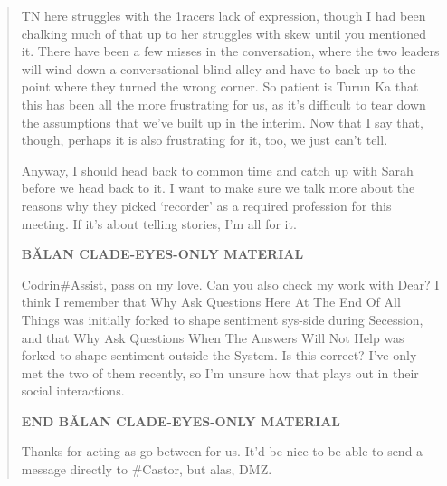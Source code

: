 \begin{quote}
TN here struggles with the 1racers lack of expression, though I had been chalking much of that up to her struggles with skew until you mentioned it. There have been a few misses in the conversation, where the two leaders will wind down a conversational blind alley and have to back up to the point where they turned the wrong corner. So patient is Turun Ka that this has been all the more frustrating for us, as it's difficult to tear down the assumptions that we've built up in the interim. Now that I say that, though, perhaps it is also frustrating for it, too, we just can't tell.

Anyway, I should head back to common time and catch up with Sarah before we head back to it. I want to make sure we talk more about the reasons why they picked `recorder' as a required profession for this meeting. If it's about telling stories, I'm all for it.

\textbf{BĂLAN CLADE-EYES-ONLY MATERIAL}

Codrin\#Assist, pass on my love. Can you also check my work with Dear? I think I remember that Why Ask Questions Here At The End Of All Things was initially forked to shape sentiment sys-side during Secession, and that Why Ask Questions When The Answers Will Not Help was forked to shape sentiment outside the System. Is this correct? I've only met the two of them recently, so I'm unsure how that plays out in their social interactions.

\textbf{END BĂLAN CLADE-EYES-ONLY MATERIAL}

Thanks for acting as go-between for us. It'd be nice to be able to send a message directly to \#Castor, but alas, DMZ.
\end{quote}
